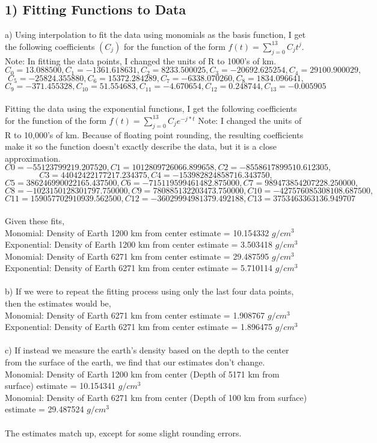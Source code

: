 \documentclass[12pt, oneside]{article}
\begin{document}
\subsection*{1) Fitting Functions to Data}
a) Using interpolation to fit the data using monomials as the basis function, I get the following coefficients $(C_{j})$ for the function of the form $f(t) = \sum_{j=0}^{13}C_{j}t^{j}$. Note: In fitting the data points, I changed the units of R to 1000's of km.
\[C_{0} = 13.088500, C_{1} = -1361.618631, C_{2} = 8233.500025, C_{3} = -20692.625254, C_{4} = 29100.900029,\] \[C_{5} = -25824.355880, 
C_{6} = 15372.284289, C_{7} = -6338.070260, C_{8} = 1834.096641,\] \[C_{9} = -371.455328, C_{10} = 51.554683, C_{11} = -4.670654, 
C_{12} = 0.248744, C_{13} = -0.005905\]\\
Fitting the data using the exponential functions, I get the following coefficients for the function of the form $f(t) = \sum_{j=0}^{13}C_{j}e^{-j*t}$ Note: I changed the units of R to 10,000's of km. Because of floating point rounding, the resulting coefficients make it so the function doesn't exactly describe the data, but it is a close approximation.
\[C0 = -55123799219.207520, C1 = 1012809726066.899658, C2 = -8558617899510.612305,\] \[C3 = 44042422177217.234375, C4 = -153982824858716.343750,\] \[C5 = 386246990022165.437500, 
C6 = -715119599461482.875000, C7 = 989473854207228.250000,\] \[C8 = -1023150128301797.750000, C9 = 780885132203473.750000,C10 = -427576085308108.687500,\] \[C11 = 159057702910939.562500, 
C12 = -36029994981379.492188, C13 = 3753463363136.949707\]\\
Given these fits,\\
Monomial: Density of Earth 1200 km from center estimate = 10.154332 $g/cm^3$\\
Exponential: Density of Earth 1200 km from center estimate = 3.503418 $g/cm^3$\\
Monomial: Density of Earth 6271 km from center estimate = 29.487595 $g/cm^3$\\
Exponential: Density of Earth 6271 km from center estimate = 5.710114 $g/cm^3$\\\\
b) If we were to repeat the fitting process using only the last four data points, then the estimates would be,\\
Monomial: Density of Earth 6271 km from center estimate = 1.908767 $g/cm^3$\\
Exponential: Density of Earth 6271 km from center estimate = 1.896475 $g/cm^3$\\\\
c) If instead we measure the earth's density based on the depth to the center from the surface of the earth, we find that our estimates don't change.\\
Monomial: Density of Earth 1200 km from center (Depth of 5171 km from surface) estimate = 10.154341 $g/cm^3$ \\
Monomial: Density of Earth 6271 km from center (Depth of 100 km from surface) estimate = 29.487524 $g/cm^3$\\\\
The estimates match up, except for some slight rounding errors.
\end{document}
